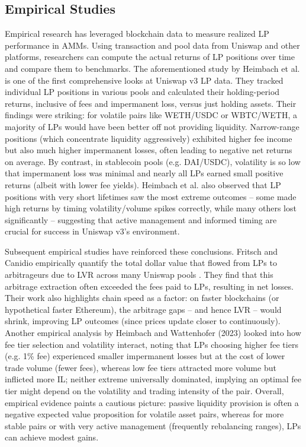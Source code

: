 \documentclass[11pt]{article}
\begin{document}
\subsection{Empirical Studies}
Empirical research has leveraged blockchain data to measure realized LP performance in AMMs. Using transaction and pool data from Uniswap and other platforms, researchers can compute the actual returns of LP positions over time and compare them to benchmarks. The aforementioned study by Heimbach et al. \cite{heimbach2022} is one of the first comprehensive looks at Uniswap v3 LP data. They tracked individual LP positions in various pools and calculated their holding-period returns, inclusive of fees and impermanent loss, versus just holding assets. Their findings were striking: for volatile pairs like WETH/USDC or WBTC/WETH, a majority of LPs would have been better off not providing liquidity. Narrow-range positions (which concentrate liquidity aggressively) exhibited higher fee income but also much higher impermanent losses, often leading to negative net returns on average. By contrast, in stablecoin pools (e.g. DAI/USDC), volatility is so low that impermanent loss was minimal and nearly all LPs earned small positive returns (albeit with lower fee yields). Heimbach et al. also observed that LP positions with very short lifetimes saw the most extreme outcomes – some made high returns by timing volatility/volume spikes correctly, while many others lost significantly – suggesting that active management and informed timing are crucial for success in Uniswap v3’s environment.

Subsequent empirical studies have reinforced these conclusions. Fritsch and Canidio empirically quantify the total dollar value that flowed from LPs to arbitrageurs due to LVR across many Uniswap pools \cite{fritsch2024}. They find that this arbitrage extraction often exceeded the fees paid to LPs, resulting in net losses. Their work also highlights chain speed as a factor: on faster blockchains (or hypothetical faster Ethereum), the arbitrage gaps – and hence LVR – would shrink, improving LP outcomes (since prices update closer to continuously). Another empirical analysis by Heimbach and Wattenhofer (2023) looked into how fee tier selection and volatility interact, noting that LPs choosing higher fee tiers (e.g. 1\% fee) experienced smaller impermanent losses but at the cost of lower trade volume (fewer fees), whereas low fee tiers attracted more volume but inflicted more IL; neither extreme universally dominated, implying an optimal fee tier might depend on the volatility and trading intensity of the pair. Overall, empirical evidence paints a cautious picture: passive liquidity provision is often a negative expected value proposition for volatile asset pairs, whereas for more stable pairs or with very active management (frequently rebalancing ranges), LPs can achieve modest gains.
\end{document}
